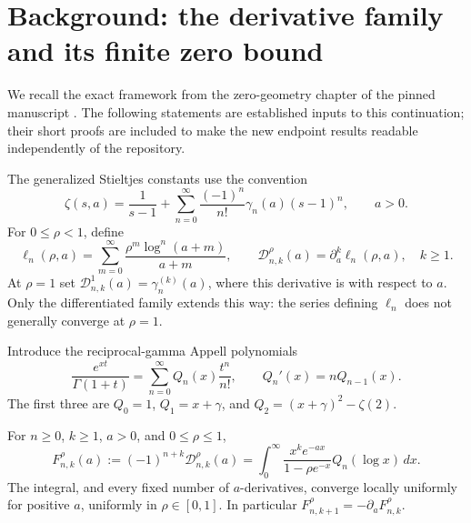 
\section{Background: the derivative family and its finite zero bound}
\label{lerchboundary:sec:background}

We recall the exact framework from the zero-geometry chapter of the
pinned manuscript \cite{ProveItSnapshot}. The following statements are established inputs to
this continuation; their short proofs are included to make the new
endpoint results readable independently of the repository.

The generalized Stieltjes constants use the convention
\[
 \zeta(s,a)=\frac1{s-1}
 +\sum_{n=0}^{\infty}\frac{(-1)^n}{n!}\gamma_n(a)(s-1)^n,
 \qquad a>0.
\]
For $0\leq\rho<1$, define
\[
 \ell_n(\rho,a)=\sum_{m=0}^{\infty}
      \frac{\rho^m\log^n(a+m)}{a+m},
 \qquad
 \mathcal D_{n,k}^{\rho}(a)=\partial_a^k\ell_n(\rho,a),
 \quad k\geq1.
\]
At $\rho=1$ set $\mathcal D_{n,k}^{1}(a)=\gamma_n^{(k)}(a)$,
where this derivative is with respect to $a$. Only the differentiated
family extends this way: the series defining $\ell_n$ does not
generally converge at $\rho=1$.

Introduce the reciprocal-gamma Appell polynomials
\begin{equation}\label{lerchboundary:eq:Q-background}
 \frac{e^{xt}}{\Gamma(1+t)}
 =\sum_{n=0}^{\infty}Q_n(x)\frac{t^n}{n!},
 \qquad Q_n'(x)=nQ_{n-1}(x).
\end{equation}
The first three are $Q_0=1$, $Q_1=x+\gamma$, and
$Q_2=(x+\gamma)^2-\zeta(2)$.

\begin{proposition}
\label{lerchboundary:prop:laplace-background}
For $n\geq0$, $k\geq1$, $a>0$, and $0\leq\rho\leq1$,
\begin{equation}\label{lerchboundary:eq:laplace-background}
 F_{n,k}^{\rho}(a):=(-1)^{n+k}\mathcal D_{n,k}^{\rho}(a)
 =\int_0^\infty
   \frac{x^k e^{-ax}}{1-\rho e^{-x}}Q_n(\log x)\,dx.
\end{equation}
The integral, and every fixed number of $a$-derivatives, converge
locally uniformly for positive $a$, uniformly in $\rho\in[0,1]$.
In particular $F_{n,k+1}^{\rho}=-\partial_aF_{n,k}^{\rho}$.
\end{proposition}

